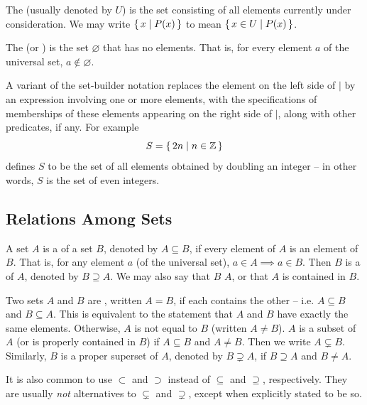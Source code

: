 The  (usually denoted by $U$) is the set consisting of all elements currently under consideration. We may write $\qty{\, x \mid P(x) \,}$ to mean $\qty{\, x \in U \mid P(x) \,}$.

The  (or ) is the set $\varnothing$ that has no elements. That is, for every element $a$ of the universal set, $a \notin \varnothing$.

\begin{Note*}
A variant of the set-builder notation replaces the element on the left side of $\mid$ by an expression involving one or more elements, with the specifications of memberships of these elements appearing on the right side of $\mid$, along with other predicates, if any. For example
\begin{equation*}
S = \qty{\, 2n \mid n \in \mathbb Z \,}
\end{equation*}
defines $S$ to be the set of all elements obtained by doubling an integer -- in other words, $S$ is the set of even integers.
\end{Note*}

\subsection{Relations Among Sets}\label{subsec:SetRels}

A set $A$ is a  of a set $B$, denoted by $A \subseteq B$, if every element of $A$ is an element of $B$. That is, for any element $a$ (of the universal set), $a \in A \implies a \in B$. Then $B$ is a  of $A$, denoted by $B \supseteq A$. We may also say that $B$  $A$, or that $A$ is contained in $B$.

Two sets $A$ and $B$ are , written $A = B$, if each contains the other -- i.e. $A \subseteq B$ and $B \subseteq A$. This is equivalent to the statement that $A$ and $B$ have exactly the same elements. Otherwise, $A$ is not equal to $B$ (written $A \ne B$). $A$ is a  subset of $A$ (or is properly contained in $B$) if $A \subseteq B$ and $A \ne B$. Then we write $A \subsetneq B$. Similarly, $B$ is a proper superset of $A$, denoted by $B \supsetneq A$, if $B \supseteq A$ and $B \ne A$.

\begin{Note*}
It is also common to use $\subset$ and $\supset$ instead of $\subseteq$ and $\supseteq$, respectively. They are usually \emph{not} alternatives to $\subsetneq$ and $\supsetneq$, except when explicitly stated to be so.
\end{Note*}

